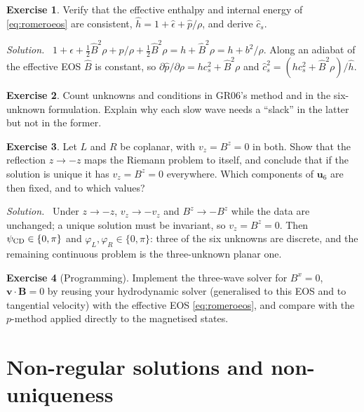 \documentclass[11pt,a4paper,oneside,openany]{book}
\theoremstyle{definition}
\newtheorem{exercise}{Exercise}[chapter]
\theoremstyle{plain}
\theoremstyle{remark}
\newenvironment{solution}{\par\smallskip\noindent\small\textit{Solution.}\ }{\par\medskip}
\newcommand{\vv}{\bm{v}}
\newcommand{\BB}{\bm{B}}
\begin{document}
\begin{exercise}
Verify that the effective enthalpy and internal energy of \eqref{eq:romeroeos} are
consistent, $\hat h=1+\hat\epsilon+\hat p/\rho$, and derive $\hat c_s$.
\end{exercise}
\begin{solution}
$1+\epsilon+\tfrac12\hat B^2\rho+p/\rho+\tfrac12\hat B^2\rho=h+\hat B^2\rho=h+b^2/\rho$.
Along an adiabat of the effective EOS $\hat B$ is constant, so
$\partial\hat p/\partial\rho=hc_s^2+\hat B^2\rho$ and $\hat c_s^2=(hc_s^2+\hat B^2\rho)/\hat h$.
\end{solution}

\begin{exercise}
Count unknowns and conditions in GR06's method and in the six-unknown formulation. Explain
why each slow wave needs a ``slack'' in the latter but not in the former.
\end{exercise}

\begin{exercise}
Let $L$ and $R$ be coplanar, with $v_z=B^z=0$ in both. Show that the reflection $z\to-z$
maps the Riemann problem to itself, and conclude that if the solution is unique it has
$v_z=B^z=0$ everywhere. Which components of $\bm u_6$ are then fixed, and to which values?
\end{exercise}
\begin{solution}
Under $z\to-z$, $v_z\to-v_z$ and $B^z\to-B^z$ while the data are unchanged; a unique
solution must be invariant, so $v_z=B^z=0$. Then $\psi_{\rm CD}\in\{0,\pi\}$ and
$\varphi_L,\varphi_R\in\{0,\pi\}$: three of the six unknowns are discrete, and the
remaining continuous problem is the three-unknown planar one.
\end{solution}

\begin{exercise}[Programming]
Implement the three-wave solver for $B^x=0$, $\vv\cdot\BB=0$ by reusing your hydrodynamic
solver (generalised to this EOS and to tangential velocity) with the effective EOS
\eqref{eq:romeroeos}, and compare with the $p$-method applied
directly to the magnetised states.
\end{exercise}


\chapter{Non-regular solutions and non-uniqueness}\label{ch:nonunique}
\end{document}
